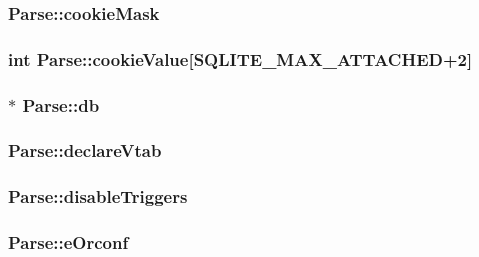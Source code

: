 \hypertarget{struct_parse_a7c0b37cf797fd157234cb2e306cba2e4}{
\subsubsection[{cookie\-Mask}]{ Parse\-::cookie\-Mask}}\label{struct_parse_a7c0b37cf797fd157234cb2e306cba2e4}
\hypertarget{struct_parse_a6023169734f87ce27a760e0f9026c381}{
\subsubsection[{cookie\-Value}]{\setlength{\rightskip}{0pt plus 5cm}int Parse\-::cookie\-Value\mbox{[}{\bf S\-Q\-L\-I\-T\-E\-\_\-\-M\-A\-X\-\_\-\-A\-T\-T\-A\-C\-H\-E\-D}+2\mbox{]}}}\label{struct_parse_a6023169734f87ce27a760e0f9026c381}
\hypertarget{struct_parse_a44364e5e1197927f89864ec345bc5491}{
\subsubsection[{db}]{$\ast$ Parse\-::db}}\label{struct_parse_a44364e5e1197927f89864ec345bc5491}
\hypertarget{struct_parse_a86c869df65cd788025680de9b6a9b1f1}{
\subsubsection[{declare\-Vtab}]{ Parse\-::declare\-Vtab}}\label{struct_parse_a86c869df65cd788025680de9b6a9b1f1}
\hypertarget{struct_parse_a5ea9b658f4cfacf4b35f18c51e144ef1}{
\subsubsection[{disable\-Triggers}]{ Parse\-::disable\-Triggers}}\label{struct_parse_a5ea9b658f4cfacf4b35f18c51e144ef1}
\hypertarget{struct_parse_a67083fd2286b7d5276831e84a1a16680}{
\subsubsection[{e\-Orconf}]{ Parse\-::e\-Orconf}}\label{struct_parse_a67083fd2286b7d5276831e84a1a16680}
